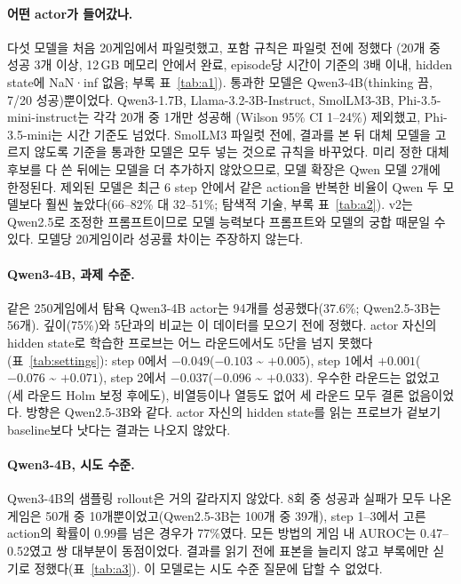 \documentclass[11pt]{article}
\begin{document}
\paragraph{어떤 actor가 들어갔나.} 다섯 모델을 처음 20게임에서 파일럿했고, 포함 규칙은 파일럿 전에 정했다
(20개 중 성공 3개 이상, 12\,GB 메모리 안에서 완료, episode당 시간이 기준의 3배 이내, hidden state에 NaN·inf 없음; 부록 표~\ref{tab:a1}).
통과한 모델은 Qwen3-4B(thinking 끔, 7/20 성공)뿐이었다. Qwen3-1.7B, Llama-3.2-3B-Instruct, SmolLM3-3B, Phi-3.5-mini-instruct는 각각 20개 중 1개만 성공해
(Wilson 95\% CI 1--24\%) 제외했고, Phi-3.5-mini는 시간 기준도 넘었다. SmolLM3 파일럿 전에, 결과를 본 뒤 대체 모델을 고르지 않도록 기준을 통과한 모델은 모두 넣는 것으로 규칙을 바꾸었다.
미리 정한 대체 후보를 다 쓴 뒤에는 모델을 더 추가하지 않았으므로, 모델 확장은 Qwen 모델 2개에 한정된다.
제외된 모델은 최근 6 step 안에서 같은 action을 반복한 비율이 Qwen 두 모델보다 훨씬 높았다(66--82\% 대 32--51\%; 탐색적 기술, 부록 표~\ref{tab:a2}).
v2는 Qwen2.5로 조정한 프롬프트이므로 모델 능력보다 프롬프트와 모델의 궁합 때문일 수 있다. 모델당 20게임이라 성공률 차이는 주장하지 않는다.

\paragraph{Qwen3-4B, 과제 수준.} 같은 250게임에서 탐욕 Qwen3-4B actor는 94개를 성공했다(37.6\%; Qwen2.5-3B는 56개).
깊이(75\%)와 5단과의 비교는 이 데이터를 모으기 전에 정했다. actor 자신의 hidden state로 학습한 프로브는 어느 라운드에서도 5단을 넘지 못했다
(표~\ref{tab:settings}): step 0에서 $-0.049$($-0.103$ \textasciitilde{} $+0.005$), step 1에서 $+0.001$($-0.076$ \textasciitilde{} $+0.071$), step 2에서 $-0.037$($-0.096$ \textasciitilde{} $+0.033$).
우수한 라운드는 없었고(세 라운드 Holm 보정 후에도), 비열등이나 열등도 없어 세 라운드 모두 결론 없음이었다.
방향은 Qwen2.5-3B와 같다. actor 자신의 hidden state를 읽는 프로브가 겉보기 baseline보다 낫다는 결과는 나오지 않았다.

\paragraph{Qwen3-4B, 시도 수준.} Qwen3-4B의 샘플링 rollout은 거의 갈라지지 않았다. 8회 중 성공과 실패가 모두 나온 게임은 50개 중 10개뿐이었고(Qwen2.5-3B는 100개 중 39개),
step 1--3에서 고른 action의 확률이 0.99를 넘은 경우가 77\%였다. 모든 방법의 게임 내 AUROC는 0.47--0.52였고 쌍 대부분이 동점이었다.
결과를 읽기 전에 표본을 늘리지 않고 부록에만 싣기로 정했다(표~\ref{tab:a3}). 이 모델로는 시도 수준 질문에 답할 수 없었다.
\end{document}
